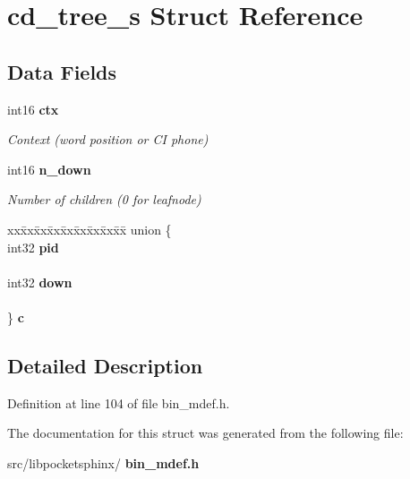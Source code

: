 \section{cd\+\_\+tree\+\_\+s Struct Reference}
\label{structcd__tree__s}
\subsection*{Data Fields}
\begin{DoxyCompactItemize}
\item 
\mbox{\label{structcd__tree__s_a2168538bf6cc21ad1a2c99fa2deb4559}} 
int16 \textbf{ ctx}
\begin{DoxyCompactList}\small\item\em Context (word position or CI phone) \end{DoxyCompactList}\item 
\mbox{\label{structcd__tree__s_ae5e735d325b0f278ff2ad55293faa616}} 
int16 \textbf{ n\+\_\+down}
\begin{DoxyCompactList}\small\item\em Number of children (0 for leafnode) \end{DoxyCompactList}\item 
\mbox{\label{structcd__tree__s_acc49ddc3248fc58d5a9bf241fffcbc2b}} 
\begin{tabbing}
xx\=xx\=xx\=xx\=xx\=xx\=xx\=xx\=xx\=\kill
union \{\\
\>int32 \textbf{ pid}\\
\>\\
\>int32 \textbf{ down}\\
\>\\
\} {\bfseries c}\\

\end{tabbing}\end{DoxyCompactItemize}


\subsection{Detailed Description}


Definition at line 104 of file bin\+\_\+mdef.\+h.



The documentation for this struct was generated from the following file\+:\begin{DoxyCompactItemize}
\item 
src/libpocketsphinx/\textbf{ bin\+\_\+mdef.\+h}\end{DoxyCompactItemize}
